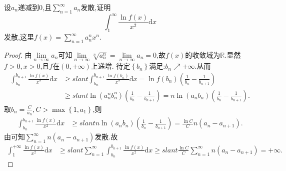 \documentclass[../../main.tex]{subfiles}
\begin{document}
\begin{example}
设$a_n$递减到$0$,且$\sum\limits_{n=1}^\infty a_n$发散,证明
$$\int_1^\infty \frac{\ln f(x)}{x^2}\mathrm{d}x$$
发散,这里$f(x)=\sum\limits_{n=1}^\infty a_n^n x^n$.
\end{example}
\begin{proof}
由$\lim\limits_{n\rightarrow \infty}a_n$可知$\lim\limits_{n\rightarrow \infty}\sqrt[n]{a_{n}^{n}}=\lim\limits_{n\rightarrow \infty}a_n=0$,故$f\left( x \right)$的收敛域为$\mathbb{R}$.显然$f>0,x>0$,且$f$在$\left( 0,+\infty \right)$上递增.
待定$\left\{ b_n \right\}$满足:$b_n\nearrow +\infty$.从而
\begin{align*}
\int_{b_n}^{b_{n+1}}{\frac{\ln f\left( x \right)}{x^2}\mathrm{d}x}&\geqslant slant \int_{b_n}^{b_{n+1}}{\frac{\ln f\left( b_n \right)}{x^2}\mathrm{d}x}=\ln f\left( b_n \right) \left( \frac{1}{b_n}-\frac{1}{b_{n+1}} \right) \\
&\geqslant slant \ln \left( a_{n}^{n}b_{n}^{n} \right) \left( \frac{1}{b_n}-\frac{1}{b_{n+1}} \right) =n\ln \left( a_nb_n \right) \left( \frac{1}{b_n}-\frac{1}{b_{n+1}} \right) .
\end{align*}
取$b_n=\frac{C}{a_n},C>\max \left\{ 1,a_1 \right\}$,则
\begin{align*}
\int_{b_n}^{b_{n+1}}{\frac{\ln f\left( x \right)}{x^2}\mathrm{d}x}&\geqslant slant n\ln \left( a_nb_n \right) \left( \frac{1}{b_n}-\frac{1}{b_{n+1}} \right) =\frac{\ln C}{C}n\left( a_n-a_{n+1} \right) .
\end{align*}
由可知$\sum_{n=1}^{\infty}{n\left( a_n-a_{n+1} \right)}$发散.故
\begin{align*}
\int_1^{+\infty}{\frac{\ln f\left( x \right)}{x^2}\mathrm{d}x}&\geqslant slant \sum_{n=1}^{\infty}{\int_{b_n}^{b_{n+1}}{\frac{\ln f\left( x \right)}{x^2}\mathrm{d}x}}\geqslant slant \frac{\ln C}{C}\sum_{n=1}^{\infty}{n\left( a_n-a_{n+1} \right)}=+\infty .
\end{align*}
\end{proof}
\end{document}
